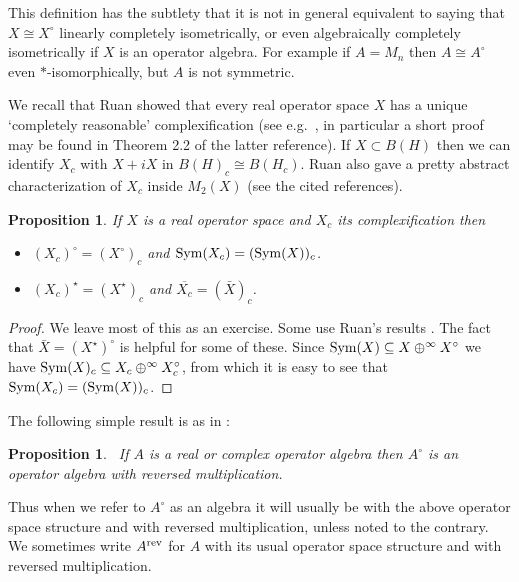 \documentclass{amsart}
\newtheorem{proposition}[theorem]{Proposition}
\theoremstyle{remark}
\theoremstyle{definition}
\numberwithin{equation}{section}
\begin{document}
This definition has the subtlety that it is not in general equivalent to saying that $X \cong X^{\circ}$ linearly completely isometrically, or even 
algebraically completely isometrically if $X$ is an operator algebra.   For example if $A = M_n$ then  $A \cong A^{\circ}$ even $*$-isomorphically, but $A$ is not symmetric.

We recall that Ruan showed that every real  operator space $X$ has a unique `completely reasonable' complexification (see e.g.\ \cite{BReal,BCK}, in particular a short proof may be found in 
Theorem 2.2 of the latter reference).  If $X \subset B(H)$ then we can identify $X_c$ with $X + iX$ in $B(H)_c \cong B(H_c)$.  Ruan also gave a pretty abstract characterization of $X_c$ inside $M_2(X)$ (see the cited references). 

\begin{proposition} \label{ciop}  If $X$ is a real  operator space and $X_c$ its complexification
 then
\begin{itemize}
\item [(1)]  $(X_c)^\circ = (X^\circ)_c$ and ${\rm Sym}(X_c) = ({\rm Sym}(X))_c$.
\item [(2)] $(X_c)^\star= (X^\star)_c$ and $\overline{X_c} = (\bar{X})_c$.
\end{itemize}
\end{proposition}

\begin{proof}       We leave most of this as an exercise.   Some use Ruan's results
\cite[Proposition 2.1 or Theorem 2.2]{BCK}. The fact  that 
 $\bar{X} = (X^{\star})^\circ$ is helpful for some of these. Since ${\rm Sym}(X) \subseteq X \oplus^\infty X^{\circ}$ we have
 ${\rm Sym}(X)_c \subseteq X_c \oplus^\infty X^{\circ}_c$, from which  it is easy to see that 
 ${\rm Sym}(X_c) = ({\rm Sym}(X))_c$.
\end{proof}


The following simple result is as in \cite{BComm,BReal}: 

\begin{proposition} \label{p1}   \ If $A$ is a real  or complex   operator algebra then $A^{\circ}$ is an operator algebra with reversed multiplication.
 \end{proposition} 

Thus when we refer to $A^{\circ}$ as an  algebra it will usually be with the above operator space structure and with reversed multiplication, unless noted to the contrary.  We sometimes write
$A^{\rm rev}$ for $A$ with its usual  operator space structure and with reversed multiplication.
\end{document}
